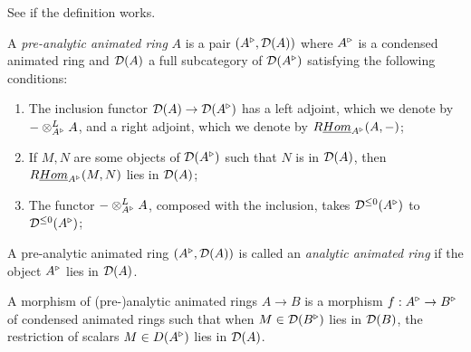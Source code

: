 See if the definition works.

\begin{definition}
\label{affine::def::with_animated_rings}
A \emph{pre-analytic animated ring} $ A $ is a pair $ (A ^{\triangleright}, \mathcal{D}(A)) $ where $ A ^{\triangleright} $ is a condensed animated ring and
$ \mathcal{D} (A) $ a full subcategory of $ \mathcal{D} (A ^{\triangleright}) $ satisfying the following conditions:

\begin{enumerate}
\item The inclusion functor $ \mathcal{D} (A)\to \mathcal{D} (A ^{\triangleright}) $ has a left adjoint, which we denote by $ -\otimes^{L} _{A ^{\triangleright}} A $,
and a right adjoint, which we denote by $ R\underline{Hom} _{A ^{\triangleright}}(A, -) $;
\item If $ M,N $ are some objects of $ \mathcal{D} (A ^{\triangleright}) $ such that $ N $ is in $\mathcal{D} (A) $, then $ R\underline{Hom} _{A ^{\triangleright}} (M, N) $ lies in $ \mathcal{D} (A) $;
\item The functor $ -\otimes^{L} _{A ^{\triangleright}} A $, composed with the inclusion, takes $ \mathcal{D} ^{\leq 0}(A ^{\triangleright}) $ to $ \mathcal{D} ^{\leq 0}(A ^{\triangleright}) $;
\end{enumerate}
A pre-analytic animated ring $ (A ^{\triangleright}, \mathcal{D} (A)) $ is called an \emph{analytic animated ring} if
the object $ A ^{\triangleright} $ lies in $ \mathcal{D} (A) $.

A morphism of (pre-)analytic animated rings $ A\to B $ is a morphism $ f: A ^{\triangleright}\to B ^{\triangleright} $ of condensed animated rings such that when
$ M\in \mathcal{D} (B ^{\triangleright}) $ lies in $ \mathcal{D} (B) $, the restriction of scalars $ M \in D (A ^{\triangleright}) $ lies in $ \mathcal{D} (A) $.
\end{definition}

